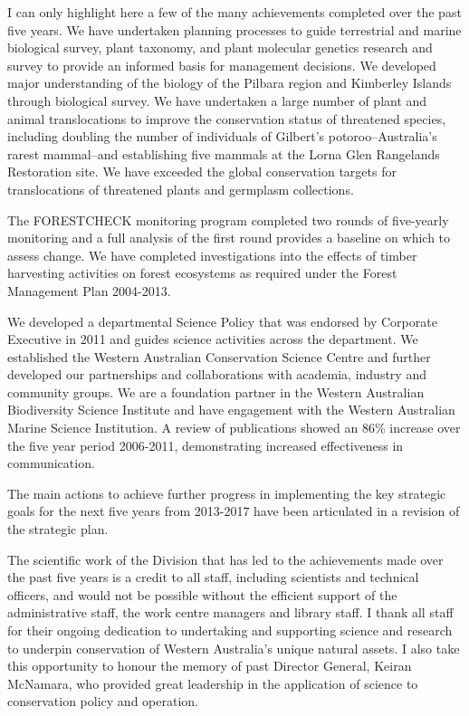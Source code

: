\documentclass[version=last, paper=a4, DIV=18, usenames, dvipsnames]{scrartcl}
\begin{document}
I can only highlight here a few of the many achievements completed over the past five years. We have undertaken planning processes to guide terrestrial and marine biological survey, plant taxonomy, and plant molecular genetics research and survey to provide an informed basis for management decisions. We developed major understanding of the biology of the Pilbara region and Kimberley Islands through biological survey. We have undertaken a large number of plant and animal translocations to improve the conservation status of threatened species, including doubling the number of individuals of Gilbert's potoroo--Australia's rarest mammal--and establishing five mammals at the Lorna Glen Rangelands Restoration site. We have exceeded the global conservation targets for translocations of threatened plants and germplasm collections.


The FORESTCHECK monitoring program completed two rounds of five-yearly monitoring and a full analysis of the first round provides a baseline on which to assess change. We have completed investigations into the effects of timber harvesting activities on forest ecosystems as required under the Forest Management Plan 2004-2013.


We developed a departmental Science Policy that was endorsed by Corporate Executive in 2011 and guides science activities across the department. We established the Western Australian Conservation Science Centre and further developed our partnerships and collaborations with academia, industry and community groups. We are a foundation partner in the Western Australian Biodiversity Science Institute and have engagement with the Western Australian Marine Science Institution. A review of publications showed an 86\% increase over the five year period 2006-2011, demonstrating increased effectiveness in communication.


The main actions to achieve further progress in implementing the key strategic goals for the next five years from 2013-2017 have been articulated in a revision of the strategic plan.


The scientific work of the Division that has led to the achievements made over the past five years is a credit to all staff, including scientists and technical officers, and would not be possible without the efficient support of the administrative staff, the work centre managers and library staff. I thank all staff for their ongoing dedication to undertaking and supporting science and research to underpin conservation of Western Australia's unique natural assets. I also take this opportunity to honour the memory of past Director General, Keiran McNamara, who provided great leadership in the application of science to conservation policy and operation.
\end{document}
